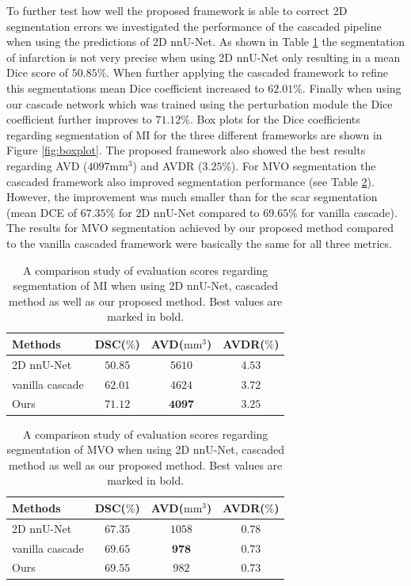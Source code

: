 \documentclass[preprint,5p,authoryear]{elsarticle}
\begin{document}
To further test how well the proposed framework is able to correct 2D segmentation errors we investigated the performance of the cascaded pipeline when using the predictions of 2D nnU-Net. As shown in Table \ref{tab:nnU-Net_scar} the  segmentation of infarction is not very precise when using 2D nnU-Net only resulting in a mean Dice score of $50.85 \%$. When further applying the cascaded framework to refine this segmentations mean Dice coefficient increased to $62.01 \%$. Finally when using our cascade network which was trained using the perturbation module the Dice coefficient further improves to $71.12 \%$. Box plots for the Dice coefficients regarding segmentation of MI for the three different frameworks are shown in Figure \ref{fig:boxplot}. The proposed framework also showed the best results regarding AVD ($4097 \mathrm{mm^3}$) and AVDR ($3.25 \%$). For MVO segmentation the cascaded framework also improved segmentation performance (see Table \ref{tab:nnU-Net_mvo}). However, the improvement was much smaller than for the scar segmentation (mean DCE of $67.35 \%$ for 2D nnU-Net compared to $69.65\%$ for vanilla cascade). The results for MVO segmentation achieved by our proposed method compared to the vanilla cascaded framework were basically the same for all three metrics. 


\begin{table}
\caption{\label{tab:nnU-Net_scar}A comparison study of evaluation scores regarding segmentation of MI when using 2D nnU-Net, cascaded method as well as our proposed method. Best values are marked in bold.}
\centering
\begin{tabular}{l | c  c  c }

Methods         &  DSC($\%$)   &  AVD($\mathrm{mm^3}$)  & AVDR($\%$)  \\
\hline
2D nnU-Net      & $50.85$      & $5610$                 & $4.53$\\
\hline
vanilla cascade & $62.01$      & $4624$                 & $3.72$ \\
\hline
Ours            & $\bm{71.12}$ & $\bm{4097}$            & $\bm{3.25}$\\
\hline
\end{tabular}
\end{table}

\begin{table}
\caption{\label{tab:nnU-Net_mvo}A comparison study of evaluation scores regarding segmentation of MVO when using 2D nnU-Net, cascaded method as well as our proposed method. Best values are marked in bold.}
\centering
\begin{tabular}{l | c  c  c }

Methods         &  DSC($\%$)  &  AVD($\mathrm{mm^3}$)  & AVDR($\%$)  \\
\hline
2D nnU-Net      & $67.35$     &	$1058$	               & $0.78$\\
\hline
vanilla cascade & $\bm{69.65}$& $\bm{978}$             & $\bm{0.73}$ \\
\hline
Ours            & $69.55$	  & $982$	               & $0.73$ \\
\hline
\end{tabular}
\end{table}
\end{document}

